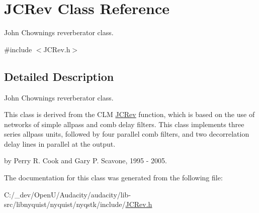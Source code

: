 \hypertarget{class_j_c_rev}{}\section{J\+C\+Rev Class Reference}
\label{class_j_c_rev}


John Chowning\textquotesingle{}s reverberator class.  




{\ttfamily \#include $<$J\+C\+Rev.\+h$>$}



\subsection{Detailed Description}
John Chowning\textquotesingle{}s reverberator class. 

This class is derived from the C\+LM \hyperlink{class_j_c_rev}{J\+C\+Rev} function, which is based on the use of networks of simple allpass and comb delay filters. This class implements three series allpass units, followed by four parallel comb filters, and two decorrelation delay lines in parallel at the output.

by Perry R. Cook and Gary P. Scavone, 1995 -\/ 2005. 

The documentation for this class was generated from the following file\+:\begin{DoxyCompactItemize}
\item 
C\+:/\+\_\+dev/\+Open\+U/\+Audacity/audacity/lib-\/src/libnyquist/nyquist/nyqstk/include/\hyperlink{_j_c_rev_8h}{J\+C\+Rev.\+h}\end{DoxyCompactItemize}
